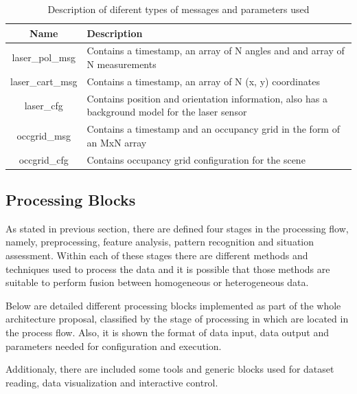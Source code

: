 \begin{table}[ht!]
\footnotesize
\centering
\begin{tabular}{|c | p{8cm}|}
\hline
\textbf{Name} & \textbf{Description} \\
\hline
laser\_pol\_msg & Contains a timestamp, an array of N angles and and array of N measurements \\
\hline
laser\_cart\_msg & Contains a timestamp, an array of N (x, y) coordinates \\
\hline
laser\_cfg & Contains position and orientation information, also has a background model for the laser sensor \\
\hline
occgrid\_msg & Contains a timestamp and an occupancy grid in the form of an MxN array \\
\hline
occgrid\_cfg & Contains occupancy grid configuration for the scene \\
\hline
\end{tabular}
\caption{Description of diferent types of messages and parameters used}
\label{desc_map}
\end{table}



\subsection{Processing Blocks}

As stated in previous section, there are defined four stages in the processing flow, namely, preprocessing, feature analysis, pattern recognition and situation assessment. Within each of these stages there are different methods and techniques used to process the data and it is possible that those methods are suitable to perform fusion between homogeneous or heterogeneous data.

Below are detailed different processing blocks implemented as part of the whole architecture proposal, classified by the stage of processing in which are located in the process flow. Also, it is shown the format of data input, data output and parameters needed for configuration and execution.

Additionaly, there are included some tools and generic blocks used for dataset reading, data visualization and interactive control.

